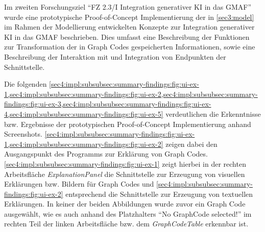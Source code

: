 Im zweiten Forschungsziel \enquote{FZ 2.3/I Integration generativer KI in das GMAF} wurde eine prototypische Proof-of-Concept Implementierung der in \cref{sec3:model} im Rahmen der Modellierung entwickelten Konzepte zur Integration generativer KI in das GMAF beschrieben.
Dies umfasst eine Beschreibung der Funktionen zur Transformation der in Graph Codes gespeicherten Informationen, sowie eine Beschreibung der Interaktion mit und Integration von Endpunkten der Schnittstelle.

Die folgenden \cref{sec4:impl:subsubsec:summary-findings:fig:ui-ex-1,sec4:impl:subsubsec:summary-findings:fig:ui-ex-2,sec4:impl:subsubsec:summary-findings:fig:ui-ex-3,sec4:impl:subsubsec:summary-findings:fig:ui-ex-4,sec4:impl:subsubsec:summary-findings:fig:ui-ex-5} verdeutlichen die Erkenntnisse bzw. Ergebnisse der prototypischen Proof-of-Concept Implementierung anhand Screenshots.
\cref{sec4:impl:subsubsec:summary-findings:fig:ui-ex-1,sec4:impl:subsubsec:summary-findings:fig:ui-ex-2} zeigen dabei den Ausgangspunkt des Programms zur Erklärung von Graph Codes.
\cref{sec4:impl:subsubsec:summary-findings:fig:ui-ex-1} zeigt hierbei in der rechten Arbeitsfläche \textit{ExplanationPanel} die Schnittstelle zur Erzeugung von visuellen Erklärungen bzw. Bildern für Graph Codes und \cref{sec4:impl:subsubsec:summary-findings:fig:ui-ex-2} entsprechend die Schnittstelle zur Erzeugung von textuellen Erklärungen.
In keiner der beiden Abbildungen wurde zuvor ein Graph Code ausgewählt, wie es auch anhand des Platzhalters \enquote{No GraphCode selected!} im rechten Teil der linken Arbeitsfläche bzw. dem \textit{GraphCodeTable} erkennbar ist.


